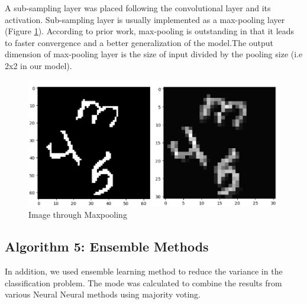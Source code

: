 \documentclass[10pt,conference]{IEEEtran}
\begin{document}
A sub-sampling layer was placed following the convolutional layer and its activation. Sub-sampling layer is usually implemented as a max-pooling layer (Figure \ref{fig:max}). According to prior work, max-pooling is outstanding in that it leads to faster convergence and a better generalization of the model\cite{scherer2010evaluation}.The output dimension of max-pooling layer is the size of input divided by the pooling size (i.e 2x2 in our model).


\begin{figure}[!tbhp]
\centering
\includegraphics[width = 0.5\linewidth]{maxpooling.jpg}
\caption{Image through Maxpooling}
\label{fig:max}
\end{figure}


\begin{table}[!tbhp]
\caption{Accuracy achieved by various algorithms}
\label{table:accr}
\end{table}


\subsection{Algorithm 5: Ensemble Methods}
In addition, we used ensemble learning method to reduce the variance in the classification problem. The mode was calculated to combine the results from various Neural Neural methods using majority voting. 
\end{document}
